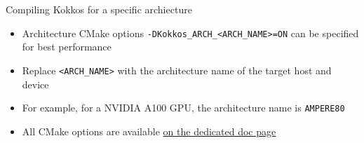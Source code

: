 \documentclass[aspectratio=169]{beamer}
\begin{document}

\begin{frame}{Compiling Kokkos for a specific archiecture}
    \begin{itemize}
        \item Architecture CMake options \texttt{-DKokkos\_ARCH\_<ARCH\_NAME>=ON} can be specified for best performance
        \item Replace \texttt{<ARCH\_NAME>} with the architecture name of the target host and device
        \item For example, for a NVIDIA A100 GPU, the architecture name is \texttt{AMPERE80}
        \item All CMake options are available \href{https://kokkos.org/kokkos-core-wiki/keywords.html}{on the dedicated doc page}
    \end{itemize}
\end{frame}

\end{document}
